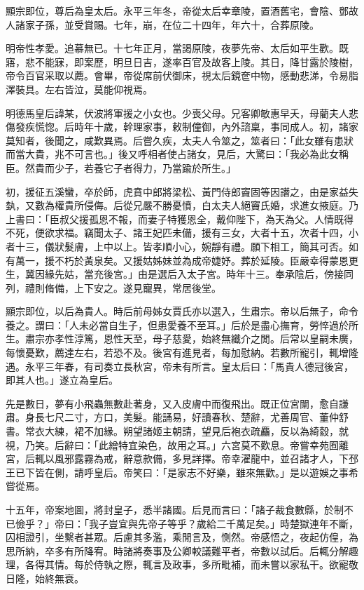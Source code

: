 \begin{pinyinscope}
顯宗即位，尊后為皇太后。永平三年冬，帝從太后幸章陵，置酒舊宅，會陰、鄧故人諸家子孫，並受賞賜。七年，崩，在位二十四年，年六十，合葬原陵。

明帝性孝愛。追慕無已。十七年正月，當謁原陵，夜夢先帝、太后如平生歡。既寤，悲不能寐，即案歷，明旦日吉，遂率百官及故客上陵。其日，降甘露於陵樹，帝令百官采取以薦。會畢，帝從席前伏御床，視太后鏡奩中物，感動悲涕，令易脂澤裝具。左右皆泣，莫能仰視焉。

明德馬皇后諱某，伏波將軍援之小女也。少喪父母。兄客卿敏惠早夭，母藺夫人悲傷發疾慌惚。后時年十歲，幹理家事，敕制僮御，內外諮稟，事同成人。初，諸家莫知者，後聞之，咸歎異焉。后嘗久疾，太夫人令筮之，筮者曰：「此女雖有患狀而當大貴，兆不可言也。」後又呼相者使占諸女，見后，大驚曰：「我必為此女稱臣。然貴而少子，若養它子者得力，乃當踰於所生。」

初，援征五溪蠻，卒於師，虎賁中郎將梁松、黃門侍郎竇固等因譖之，由是家益失埶，又數為權貴所侵侮。后從兄嚴不勝憂憤，白太夫人絕竇氏婚，求進女掖庭。乃上書曰：「臣叔父援孤恩不報，而妻子特獲恩全，戴仰陛下，為天為父。人情既得不死，便欲求福。竊聞太子、諸王妃匹未備，援有三女，大者十五，次者十四，小者十三，儀狀髮膚，上中以上。皆孝順小心，婉靜有禮。願下相工，簡其可否。如有萬一，援不朽於黃泉矣。又援姑姊妹並為成帝婕妤。葬於延陵。臣嚴幸得蒙恩更生，冀因緣先姑，當充後宮。」由是選后入太子宮。時年十三。奉承陰后，傍接同列，禮則脩備，上下安之。遂見寵異，常居後堂。

顯宗即位，以后為貴人。時后前母姊女賈氏亦以選入，生肅宗。帝以后無子，命令養之。謂曰：「人未必當自生子，但患愛養不至耳。」后於是盡心撫育，勞悴過於所生。肅宗亦孝性淳篤，恩性天至，母子慈愛，始終無纖介之閒。后常以皇嗣未廣，每懷憂歎，薦達左右，若恐不及。後宮有進見者，每加慰納。若數所寵引，輒增隆遇。永平三年春，有司奏立長秋宮，帝未有所言。皇太后曰：「馬貴人德冠後宮，即其人也。」遂立為皇后。

先是數日，夢有小飛蟲無數赴著身，又入皮膚中而復飛出。既正位宮闈，愈自謙肅。身長七尺二寸，方口，美髮。能誦易，好讀春秋、楚辭，尤善周官、董仲舒書。常衣大練，裙不加緣。朔望諸姬主朝請，望見后袍衣疏麤，反以為綺縠，就視，乃笑。后辭曰：「此繒特宜染色，故用之耳。」六宮莫不歎息。帝嘗幸苑囿離宮，后輒以風邪露霧為戒，辭意款備，多見詳擇。帝幸濯龍中，並召諸才人，下邳王已下皆在側，請呼皇后。帝笑曰：「是家志不好樂，雖來無歡。」是以遊娛之事希嘗從焉。

十五年，帝案地圖，將封皇子，悉半諸國。后見而言曰：「諸子裁食數縣，於制不已儉乎？」帝曰：「我子豈宜與先帝子等乎？歲給二千萬足矣。」時楚獄連年不斷，囚相證引，坐繫者甚眾。后慮其多濫，乘閒言及，惻然。帝感悟之，夜起仿偟，為思所納，卒多有所降宥。時諸將奏事及公卿較議難平者，帝數以試后。后輒分解趣理，各得其情。每於侍執之際，輒言及政事，多所毗補，而未嘗以家私干。欲寵敬日隆，始終無衰。


\end{pinyinscope}

